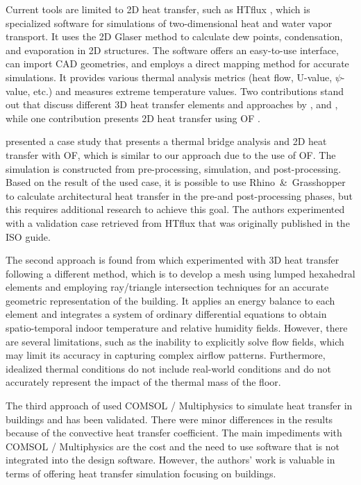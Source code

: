 Current tools are limited to 2D heat transfer, such as HTflux \cite{HTflux}, which is specialized software for simulations of two-dimensional heat and water vapor transport.
It uses the 2D Glaser method \cite{glaser1959graphisches} to calculate dew points, condensation, and evaporation in 2D structures. 
The software offers an easy-to-use interface, can import \gls{CAD} geometries, and employs a direct mapping method for accurate simulations. 
It provides various thermal analysis metrics (heat flow, U-value, $\psi$-value, etc.) and measures extreme temperature values. Two contributions stand out that discuss different 3D heat transfer elements and approaches by  \citeauthor{Yang} \cite{Yang}, and \citeauthor{COMSOL} \cite{COMSOL}, while one contribution presents 2D heat transfer using \gls{OF} \cite{kastner2020solving}.

\citeauthor{kastner2020solving} \cite{kastner2020solving} presented a case study that presents a thermal bridge analysis and 2D heat transfer with \gls{OF}, which is similar to our approach due to the use of \gls{OF}. The simulation is constructed from pre-processing, simulation, and post-processing. 
Based on the result of the used case, it is possible to use Rhino\ \&\ Grasshopper to calculate architectural heat transfer in the pre-and post-processing phases, but this requires additional research to achieve this goal. 
The authors experimented with a validation case retrieved from HTflux that was originally published in the ISO guide. 

The second approach is found from \citeauthor{Yang} \cite{Yang} which experimented with 3D heat transfer following a different method, which is to develop a mesh using lumped hexahedral elements and employing ray/triangle intersection techniques for an accurate geometric representation of the building. 
It applies an energy balance to each element and integrates a system of ordinary differential equations to obtain spatio-temporal indoor temperature and relative humidity fields. 
However, there are several limitations, such as the inability to explicitly solve flow fields, which may limit its accuracy in capturing complex airflow patterns. 
Furthermore, idealized thermal conditions do not include real-world conditions and do not accurately represent the impact of the thermal mass of the floor. 


The third approach of \citeauthor{COMSOL} \cite{COMSOL} used COMSOL / Multiphysics to simulate heat transfer in buildings and has been validated. There were minor differences in the results because of the convective heat transfer coefficient. 
The main impediments with COMSOL / Multiphysics are the cost and the need to use software that is not integrated into the design software.
However, the authors' work is valuable in terms of offering heat transfer simulation focusing on buildings.  %

